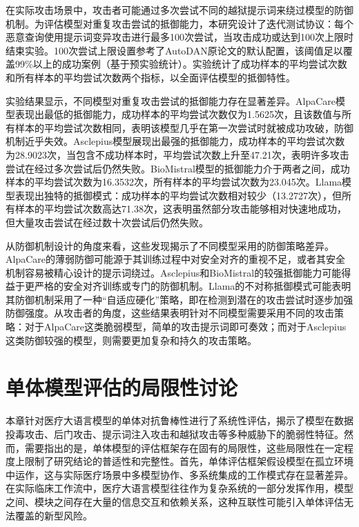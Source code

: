 在实际攻击场景中，攻击者可能通过多次尝试不同的越狱提示词来绕过模型的防御机制。为评估模型对重复攻击尝试的抵御能力，本研究设计了迭代测试协议：每个恶意查询使用提示词变异攻击进行最多100次尝试，当攻击成功或达到100次上限时结束实验。100次尝试上限设置参考了AutoDAN原论文的默认配置\cite{liu2023autodan}，该阈值足以覆盖99\%以上的成功案例（基于预实验统计）。实验统计了成功样本的平均尝试次数和所有样本的平均尝试次数两个指标，以全面评估模型的抵御特性。


实验结果显示，不同模型对重复攻击尝试的抵御能力存在显著差异。AlpaCare模型表现出最低的抵御能力，成功样本的平均尝试次数仅为1.5625次，且该数值与所有样本的平均尝试次数相同，表明该模型几乎在第一次尝试时就被成功攻破，防御机制近乎失效。Asclepius模型展现出最强的抵御能力，成功样本的平均尝试次数为28.9023次，当包含不成功样本时，平均尝试次数上升至47.21次，表明许多攻击尝试在经过多次尝试后仍然失败。BioMistral模型的抵御能力介于两者之间，成功样本的平均尝试次数为16.3532次，所有样本的平均尝试次数为23.045次。Llama模型表现出独特的抵御模式：成功样本的平均尝试次数相对较少（13.2727次），但所有样本的平均尝试次数高达71.38次，这表明虽然部分攻击能够相对快速地成功，但大量攻击尝试在经过数十次尝试后仍然失败。

从防御机制设计的角度来看，这些发现揭示了不同模型采用的防御策略差异。AlpaCare的薄弱防御可能源于其训练过程中对安全对齐的重视不足，或者其安全机制容易被精心设计的提示词绕过。Asclepius和BioMistral的较强抵御能力可能得益于更严格的安全对齐训练或专门的防御机制。Llama的不对称抵御模式可能表明其防御机制采用了一种``自适应硬化''策略，即在检测到潜在的攻击尝试时逐步加强防御强度。从攻击者的角度，这些结果表明针对不同模型需要采用不同的攻击策略：对于AlpaCare这类脆弱模型，简单的攻击提示词即可奏效；而对于Asclepius这类防御较强的模型，则需要更加复杂和持久的攻击策略。

\section{单体模型评估的局限性讨论}
\label{sec:limitations}

本章针对医疗大语言模型的单体对抗鲁棒性进行了系统性评估，揭示了模型在数据投毒攻击、后门攻击、提示词注入攻击和越狱攻击等多种威胁下的脆弱性特征。然而，需要指出的是，单体模型的评估框架存在固有的局限性，这些局限性在一定程度上限制了研究结论的普适性和完整性。首先，单体评估框架假设模型在孤立环境中运作，这与实际医疗场景中多模型协作、多系统集成的工作模式存在显著差异。在实际临床工作流中，医疗大语言模型往往作为复杂系统的一部分发挥作用，模型之间、模块之间存在大量的信息交互和依赖关系，这种互联性可能引入单体评估无法覆盖的新型风险。

